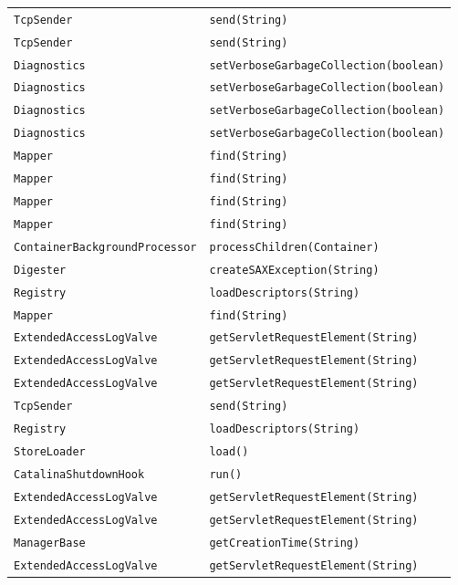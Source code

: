 \begin{center}
\begin{longtable}{ll}
\lstinline/TcpSender/&{\lstinline/send(String)/}\\
\lstinline/TcpSender/&{\lstinline/send(String)/}\\
\lstinline/Diagnostics/&{\lstinline/setVerboseGarbageCollection(boolean)/}\\
\lstinline/Diagnostics/&{\lstinline/setVerboseGarbageCollection(boolean)/}\\
\lstinline/Diagnostics/&{\lstinline/setVerboseGarbageCollection(boolean)/}\\
\lstinline/Diagnostics/&{\lstinline/setVerboseGarbageCollection(boolean)/}\\
\lstinline/Mapper/&{\lstinline/find(String)/}\\
\lstinline/Mapper/&{\lstinline/find(String)/}\\
\lstinline/Mapper/&{\lstinline/find(String)/}\\
\lstinline/Mapper/&{\lstinline/find(String)/}\\
\lstinline/ContainerBackgroundProcessor/&{\lstinline/processChildren(Container)/}\\
\lstinline/Digester/&{\lstinline/createSAXException(String)/}\\
\lstinline/Registry/&{\lstinline/loadDescriptors(String)/}\\
\lstinline/Mapper/&{\lstinline/find(String)/}\\
\lstinline/ExtendedAccessLogValve/&{\lstinline/getServletRequestElement(String)/}\\
\lstinline/ExtendedAccessLogValve/&{\lstinline/getServletRequestElement(String)/}\\
\lstinline/ExtendedAccessLogValve/&{\lstinline/getServletRequestElement(String)/}\\
\lstinline/TcpSender/&{\lstinline/send(String)/}\\
\lstinline/Registry/&{\lstinline/loadDescriptors(String)/}\\
\lstinline/StoreLoader/&{\lstinline/load()/}\\
\lstinline/CatalinaShutdownHook/&{\lstinline/run()/}\\
\lstinline/ExtendedAccessLogValve/&{\lstinline/getServletRequestElement(String)/}\\
\lstinline/ExtendedAccessLogValve/&{\lstinline/getServletRequestElement(String)/}\\
\lstinline/ManagerBase/&{\lstinline/getCreationTime(String)/}\\
\lstinline/ExtendedAccessLogValve/&{\lstinline/getServletRequestElement(String)/}\\

\end{longtable}
\end{center}
